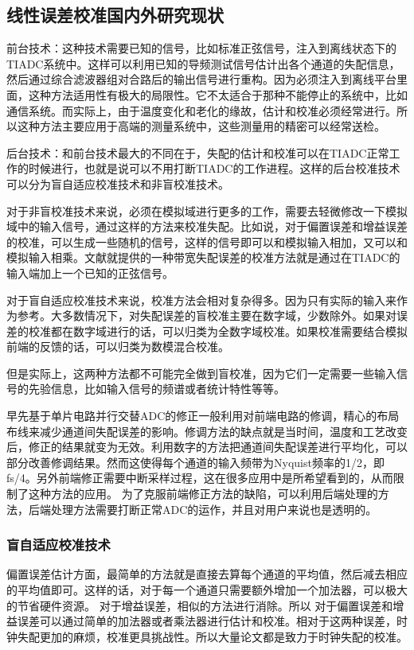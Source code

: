 	
	\subsection {线性误差校准国内外研究现状}
	
		
		前台技术：这种技术需要已知的信号，比如标准正弦信号，注入到离线状态下的TIADC系统中。这样可以利用已知的导频测试信号估计出各个通道的失配信息，然后通过综合滤波器组对合路后的输出信号进行重构。因为必须注入到离线平台里面，这种方法适用性有极大的局限性。它不太适合于那种不能停止的系统中，比如通信系统。而实际上，由于温度变化和老化的缘故，估计和校准必须经常进行。所以这种方法主要应用于高端的测量系统中，这些测量用的精密可以经常送检。\par
		
		后台技术：和前台技术最大的不同在于，失配的估计和校准可以在TIADC正常工作的时候进行，也就是说可以不用打断TIADC的工作进程。这样的后台校准技术可以分为盲自适应校准技术和非盲校准技术。\par
		对于非盲校准技术来说，必须在模拟域进行更多的工作，需要去轻微修改一下模拟域中的输入信号，通过这样的方法来校准失配。比如说，对于偏置误差和增益误差的校准，可以生成一些随机的信号，这样的信号即可以和模拟输入相加，又可以和模拟输入相乘。文献就提供的一种带宽失配误差的校准方法就是通过在TIADC的输入端加上一个已知的正弦信号。\par


		对于盲自适应校准技术来说，校准方法会相对复杂得多。因为只有实际的输入来作为参考。大多数情况下，对失配误差的盲校准主要在数字域，少数除外。如果对误差的校准都在数字域进行的话，可以归类为全数字域校准。如果校准需要结合模拟前端的反馈的话，可以归类为数模混合校准。\par
		但是实际上，这两种方法都不可能完全做到盲校准，因为它们一定需要一些输入信号的先验信息，比如输入信号的频谱或者统计特性等等。\par
	
		早先基于单片电路并行交替ADC的修正一般利用对前端电路的修调，精心的布局布线来减少通道间失配误差的影响。修调方法的缺点就是当时间，温度和工艺改变后，修正的结果就变为无效。利用数字的方法把通道间失配误差进行平均化，可以部分改善修调结果。然而这使得每个通道的输入频带为Nyquist频率的1/2，即fs/4。另外前端修正需要中断采样过程，这在很多应用中是所希望看到的，从而限制了这种方法的应用。
		为了克服前端修正方法的缺陷，可以利用后端处理的方法，后端处理方法需要打断正常ADC的运作，并且对用户来说也是透明的。
		
		
			\subsubsection {盲自适应校准技术}
				偏置误差估计方面，最简单的方法就是直接去算每个通道的平均值，然后减去相应的平均值即可。这样的话，对于每一个通道只需要额外增加一个加法器，可以极大的节省硬件资源。
				对于增益误差，相似的方法进行消除。所以				
				对于偏置误差和增益误差可以通过简单的加法器或者乘法器进行估计和校准。相对于这两种误差，时钟失配更加的麻烦，校准更具挑战性。所以大量论文都是致力于时钟失配的校准。\par
				
